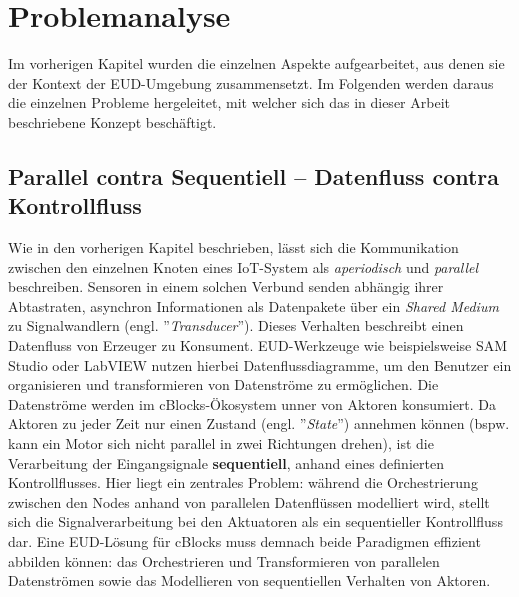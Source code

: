 \section{Problemanalyse}\label{sec:problemanalyse}
Im vorherigen Kapitel wurden die einzelnen Aspekte aufgearbeitet, aus denen sie der Kontext der \ac{EUD}-Umgebung zusammensetzt. Im Folgenden werden daraus die einzelnen Probleme hergeleitet, mit welcher sich das in dieser Arbeit beschriebene Konzept beschäftigt.

\subsection{Parallel contra Sequentiell -- Datenfluss contra Kontrollfluss}
Wie in den vorherigen Kapitel beschrieben, lässt sich die Kommunikation zwischen den einzelnen Knoten eines \ac{IoT}-System als \textit{aperiodisch} und \textit{parallel} beschreiben. Sensoren in einem solchen Verbund senden abhängig ihrer Abtastraten, asynchron Informationen als Datenpakete über ein \textit{Shared Medium} zu Signalwandlern (engl. ''\textit{Transducer}''). Dieses Verhalten beschreibt einen Datenfluss von Erzeuger zu Konsument. \ac{EUD}-Werkzeuge wie beispielsweise SAM Studio oder LabVIEW nutzen hierbei Datenflussdiagramme, um den Benutzer ein organisieren und transformieren von Datenströme zu ermöglichen. Die Datenströme werden im \acp{cBlock}-Ökosystem unner von Aktoren konsumiert. Da Aktoren zu jeder Zeit nur einen Zustand (engl. ''\textit{State}'') annehmen können (bspw. kann ein Motor sich nicht parallel in zwei Richtungen drehen), ist die Verarbeitung der Eingangsignale \textbf{sequentiell}, anhand eines definierten Kontrollflusses. Hier liegt ein zentrales Problem: während die Orchestrierung zwischen den Nodes anhand von parallelen Datenflüssen modelliert wird, stellt sich die Signalverarbeitung bei den Aktuatoren als ein sequentieller Kontrollfluss dar. Eine \ac{EUD}-Lösung für cBlocks muss demnach beide Paradigmen effizient abbilden können: das Orchestrieren und Transformieren von parallelen Datenströmen sowie das Modellieren von sequentiellen Verhalten von Aktoren.

